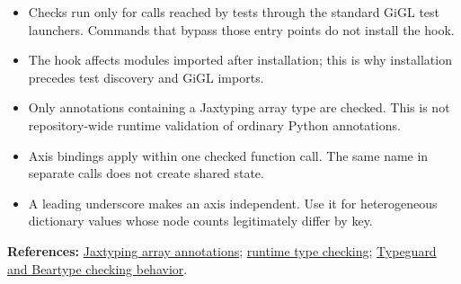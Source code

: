 \documentclass[10pt]{article}
\begin{document}
\begin{itemize}
  \item Checks run only for calls reached by tests through the standard GiGL test launchers. Commands that bypass those entry points do not install the hook.
  \item The hook affects modules imported after installation; this is why installation precedes test discovery and GiGL imports.
  \item Only annotations containing a Jaxtyping array type are checked. This is not repository-wide runtime validation of ordinary Python annotations.
  \item Axis bindings apply within one checked function call. The same name in separate calls does not create shared state.
  \item A leading underscore makes an axis independent. Use it for heterogeneous dictionary values whose node counts legitimately differ by key.
\end{itemize}

\vfill
{\scriptsize\color{muted}
\textbf{References:}
\href{https://docs.kidger.site/jaxtyping/api/array/}{Jaxtyping array annotations};
\href{https://docs.kidger.site/jaxtyping/api/runtime-type-checking/}{runtime type checking};
\href{https://docs.kidger.site/jaxtyping/}{Typeguard and Beartype checking behavior}.
}
\end{document}

